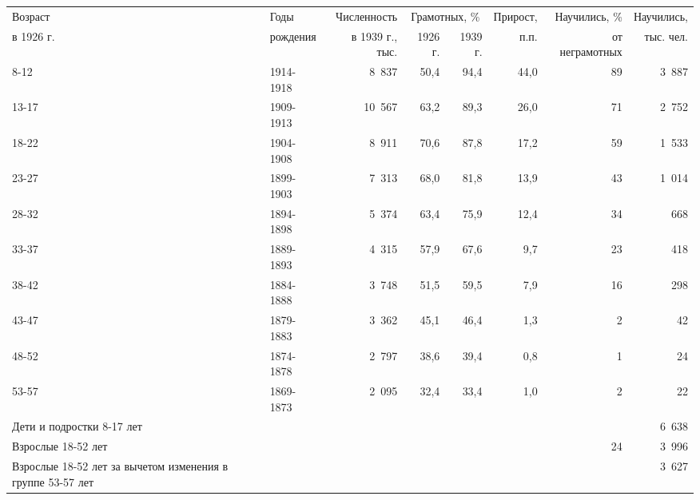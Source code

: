 \begin{tabular}{llrrrrrr}
\toprule
Возраст & Годы & Численность & \multicolumn{2}{c}{Грамотных, \%} & Прирост, & Научились, \% & Научились, \\
\cmidrule(lr){4-5}
в 1926 г. & рождения & в 1939 г., тыс. & 1926 г. & 1939 г. & п.п. & от неграмотных & тыс. чел. \\
\midrule
8-12 & 1914-1918 & 8~837 & 50,4 & 94,4 & 44,0 & 89 & 3~887 \\
13-17 & 1909-1913 & 10~567 & 63,2 & 89,3 & 26,0 & 71 & 2~752 \\
18-22 & 1904-1908 & 8~911 & 70,6 & 87,8 & 17,2 & 59 & 1~533 \\
23-27 & 1899-1903 & 7~313 & 68,0 & 81,8 & 13,9 & 43 & 1~014 \\
28-32 & 1894-1898 & 5~374 & 63,4 & 75,9 & 12,4 & 34 & 668 \\
33-37 & 1889-1893 & 4~315 & 57,9 & 67,6 & 9,7 & 23 & 418 \\
38-42 & 1884-1888 & 3~748 & 51,5 & 59,5 & 7,9 & 16 & 298 \\
43-47 & 1879-1883 & 3~362 & 45,1 & 46,4 & 1,3 & 2 & 42 \\
48-52 & 1874-1878 & 2~797 & 38,6 & 39,4 & 0,8 & 1 & 24 \\
53-57 & 1869-1873 & 2~095 & 32,4 & 33,4 & 1,0 & 2 & 22 \\
\midrule
Дети и подростки 8-17 лет & & & & & & & 6~638 \\
Взрослые 18-52 лет & & & & & & 24 & 3~996 \\
Взрослые 18-52 лет за вычетом изменения в группе 53-57 лет & & & & & & & 3~627 \\
\bottomrule
\end{tabular}

